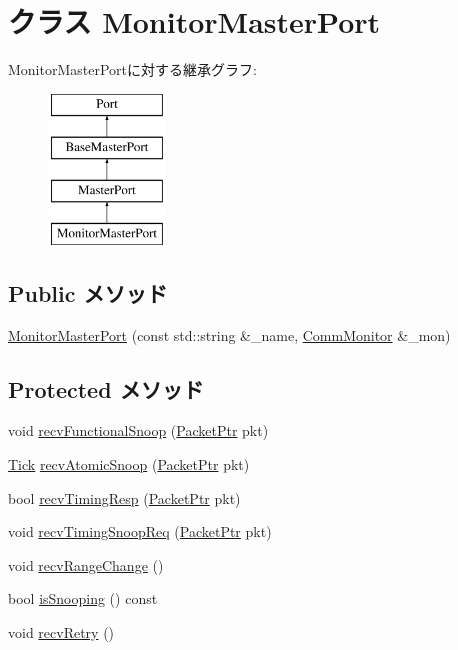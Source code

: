 \hypertarget{classCommMonitor_1_1MonitorMasterPort}{
\section{クラス MonitorMasterPort}
\label{classCommMonitor_1_1MonitorMasterPort}
}
MonitorMasterPortに対する継承グラフ:\begin{figure}[H]
\begin{center}
\leavevmode
\includegraphics[height=4cm]{classCommMonitor_1_1MonitorMasterPort}
\end{center}
\end{figure}
\subsection*{Public メソッド}
\begin{DoxyCompactItemize}
\item 
\hyperlink{classCommMonitor_1_1MonitorMasterPort_ad1e9ab98eaca885ba1511068ee61ab87}{MonitorMasterPort} (const std::string \&\_\-name, \hyperlink{classCommMonitor_1_1CommMonitor}{CommMonitor} \&\_\-mon)
\end{DoxyCompactItemize}
\subsection*{Protected メソッド}
\begin{DoxyCompactItemize}
\item 
void \hyperlink{classCommMonitor_1_1MonitorMasterPort_a284dfb90c168233c9d416bc07de8fefe}{recvFunctionalSnoop} (\hyperlink{classPacket}{PacketPtr} pkt)
\item 
\hyperlink{base_2types_8hh_a5c8ed81b7d238c9083e1037ba6d61643}{Tick} \hyperlink{classCommMonitor_1_1MonitorMasterPort_a886d584c81ee4e398ff8069907f6e1a5}{recvAtomicSnoop} (\hyperlink{classPacket}{PacketPtr} pkt)
\item 
bool \hyperlink{classCommMonitor_1_1MonitorMasterPort_a482dba5588f4bee43e498875a61e5e0b}{recvTimingResp} (\hyperlink{classPacket}{PacketPtr} pkt)
\item 
void \hyperlink{classCommMonitor_1_1MonitorMasterPort_aff3031c56fc4947a19695c868bb8233e}{recvTimingSnoopReq} (\hyperlink{classPacket}{PacketPtr} pkt)
\item 
void \hyperlink{classCommMonitor_1_1MonitorMasterPort_aecf310a01b533ae8700eccac2cf20480}{recvRangeChange} ()
\item 
bool \hyperlink{classCommMonitor_1_1MonitorMasterPort_a5ce11b7a254d3cb756d94568f7cbc25d}{isSnooping} () const 
\item 
void \hyperlink{classCommMonitor_1_1MonitorMasterPort_a29cb5a4f98063ce6e9210eacbdb35298}{recvRetry} ()
\end{DoxyCompactItemize}

